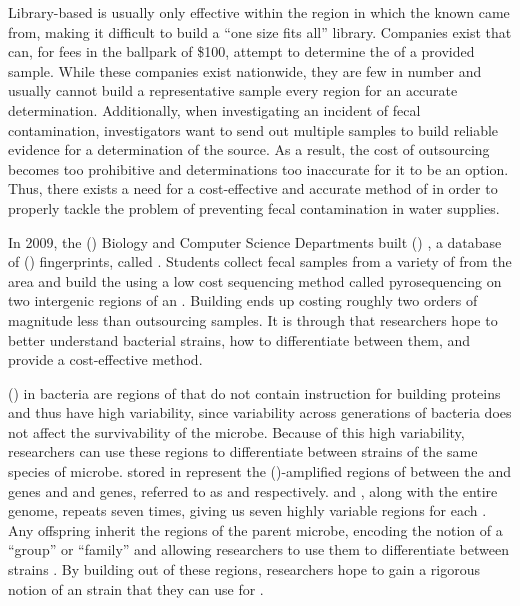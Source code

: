 Library-based \mst{} is usually only effective within the region in which the known\spec{} \isols{} came from, making it difficult to build a ``one size fits all'' library.
Companies exist that can, for fees in the ballpark of \$100, attempt to determine the \spec{} of a provided sample.
While these companies exist nationwide, they are few in number and usually cannot build a representative sample every region for an accurate determination.
Additionally, when investigating an incident of fecal contamination, investigators want to send out multiple samples to build reliable evidence for a determination of the source.
As a result, the cost of outsourcing becomes too prohibitive and determinations too inaccurate for it to be an option.
Thus, there exists a need for a cost-effective and accurate method of \mst{} in order to properly tackle the problem of preventing fecal contamination in water supplies.

In 2009, the \cplong{} (\cp{}) Biology and Computer Science Departments built \cploplong{} (\cplop{}) \cite{soliman2013cplop}, a database of \ecolilong{} (\ecoli{}) \isol{} fingerprints, called \pyros{}.
Students collect fecal samples from a variety of \spec{} from the \slo{} area and build the \pyros{} using a low cost \dna{} sequencing method called pyrosequencing on two intergenic regions of an \ecoli{} \isol{}.
Building \pyros{} ends up costing roughly two orders of magnitude less than outsourcing samples.
It is through \cplop{} that \cp{} researchers hope to better understand bacterial strains, how to differentiate between them, and provide a cost-effective \mst{} method.

\ITSlongs{} (\itsshort{}) in bacteria are regions of \dna{} that do not contain instruction for building proteins and thus have high variability, since variability across generations of bacteria does not affect the survivability of the microbe.
Because of this high variability, researchers can use these regions to differentiate between strains of the same species of microbe.
\ecoli{} \isol{} \pyros{} stored in \cplop{} represent the \pcrlong{} (\pcr{})-amplified regions of \dna{} between the \Gsixt{} and \Gtwen{} genes and \Gtwen{} and \Gfive{} genes, referred to as \Ssixt{} and \Sfive{} respectively.
\Ssixt{} and \Sfive{}, along with the entire \ecoli{} genome, repeats seven times, giving us seven highly variable regions for each \itsshort{}.
Any offspring inherit the \itsshort{} regions of the parent microbe, encoding the notion of a ``group'' or ``family'' and allowing researchers to use them to differentiate between strains \cite{SolimanDVMBNWKG12}.
By building \pyros{} out of these regions, \cplop{} researchers hope to gain a rigorous notion of an \ecoli{} strain that they can use for \mst{}.

